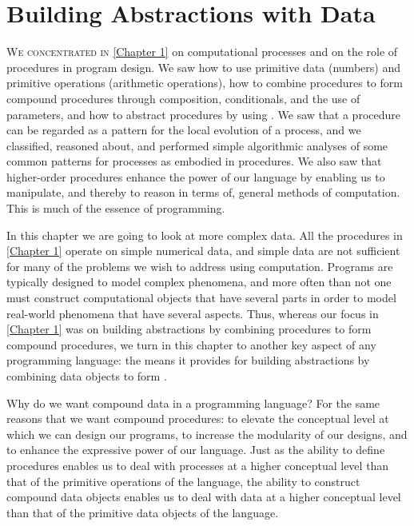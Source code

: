 \chapter{Building Abstractions with Data}
\label{Chapter 2}


\vspace{2em}

\lettrine[findent=1pt]{W}{e concentrated in} \cref{Chapter 1} on computational processes and on the role of procedures in program design.
We saw how to use primitive data (numbers) and primitive operations (arithmetic operations), how to combine procedures to form compound procedures through composition, conditionals, and the use of parameters, and how to abstract procedures by using .
We saw that a procedure can be regarded as a pattern for the local evolution of a process, and we classified, reasoned about, and performed simple algorithmic analyses of some common patterns for processes as embodied in procedures.
We also saw that higher-order procedures enhance the power of our language by enabling us to manipulate, and thereby to reason in terms of, general methods of computation.
This is much of the essence of programming.

In this chapter we are going to look at more complex data.
All the procedures in \cref{Chapter 1} operate on simple numerical data, and simple data are not sufficient for many of the problems we wish to address using computation.
Programs are typically designed to model complex phenomena, and more often than not one must construct computational objects that have several parts in order to model real-world phenomena that have several aspects.
Thus, whereas our focus in \cref{Chapter 1} was on building abstractions by combining procedures to form compound procedures, we turn in this chapter to another key aspect of any programming language:
the means it provides for building abstractions by combining data objects to form .

Why do we want compound data in a programming language?
For the same reasons that we want compound procedures:
to elevate the conceptual level at which we can design our programs, to increase the modularity of our designs, and to enhance the expressive power of our language.
Just as the ability to define procedures enables us to deal with processes at a higher conceptual level than that of the primitive operations of the language, the ability to construct compound data objects enables us to deal with data at a higher conceptual level than that of the primitive data objects of the language.


